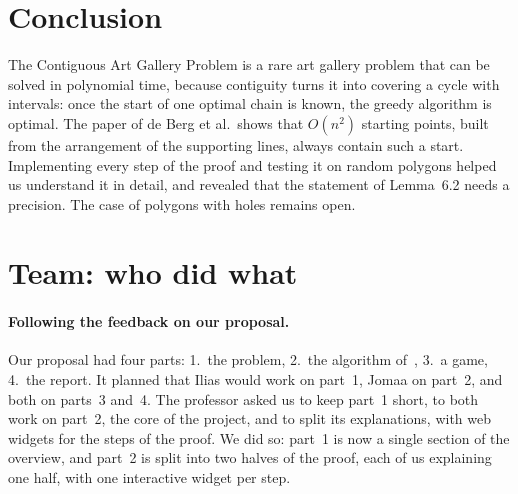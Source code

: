 \documentclass[11pt,a4paper]{article}
\theoremstyle{definition}
\theoremstyle{remark}
\begin{document}
\section{Conclusion}

The Contiguous Art Gallery Problem is a rare art gallery problem that can be solved in polynomial time, because contiguity turns it into covering a
cycle with intervals: once the start of one optimal chain is known, the greedy algorithm is optimal. The paper of de Berg et al.\ shows that $O(n^2)$ starting
points, built from the arrangement of the supporting lines, always contain such a start. Implementing every step of the proof and testing it on random
polygons helped us understand it in detail, and revealed that the statement of Lemma~6.2 needs a precision. The case of polygons with holes remains open.

\section{Team: who did what}

\paragraph{Following the feedback on our proposal.} Our proposal had four parts: 1.~the problem, 2.~the algorithm of~\cite{deBerg2025}, 3.~a game, 4.~the report.
It planned that Ilias would work on part~1, Jomaa on part~2, and both on parts~3 and~4. The professor asked us to keep part~1 short, to both work on part~2,
the core of the project, and to split its explanations, with web widgets for the steps of the proof. We did so: part~1 is now a single section of the overview,
and part~2 is split into two halves of the proof, each of us explaining one half, with one interactive widget per step.
\end{document}

